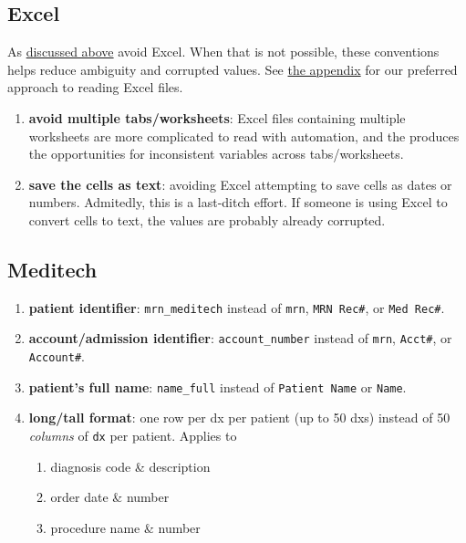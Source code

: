 \documentclass[
]{book}
\begin{document}
\hypertarget{data-conventions-excel}{%
\subsection{Excel}\label{data-conventions-excel}}

As \href{\%7B\#data-containers-avoid}{discussed above} avoid Excel. When that is not possible, these conventions helps reduce ambiguity and corrupted values. See \protect\hyperlink{snippets-reading-excel}{the appendix} for our preferred approach to reading Excel files.

\begin{enumerate}
\def\labelenumi{\arabic{enumi}.}
\item
  \textbf{avoid multiple tabs/worksheets}: Excel files containing multiple worksheets are more complicated to read with automation, and the produces the opportunities for inconsistent variables across tabs/worksheets.
\item
  \textbf{save the cells as text}: avoiding Excel attempting to save cells as dates or numbers. Admitedly, this is a last-ditch effort. If someone is using Excel to convert cells to text, the values are probably already corrupted.
\end{enumerate}

\hypertarget{data-conventions-meditech}{%
\subsection{Meditech}\label{data-conventions-meditech}}

\begin{enumerate}
\def\labelenumi{\arabic{enumi}.}
\item
  \textbf{patient identifier}: \texttt{mrn\_meditech} instead of \texttt{mrn}, \texttt{MRN\ Rec\#}, or \texttt{Med\ Rec\#}.
\item
  \textbf{account/admission identifier}: \texttt{account\_number} instead of \texttt{mrn}, \texttt{Acct\#}, or \texttt{Account\#}.
\item
  \textbf{patient's full name}: \texttt{name\_full} instead of \texttt{Patient\ Name} or \texttt{Name}.
\item
  \textbf{long/tall format}: one row per dx per patient (up to 50 dxs) instead of 50 \emph{columns} of \texttt{dx} per patient. Applies to

  \begin{enumerate}
  \def\labelenumii{\arabic{enumii}.}
  \item
    diagnosis code \& description
  \item
    order date \& number
  \item
    procedure name \& number
  \end{enumerate}
\end{enumerate}
\end{document}

